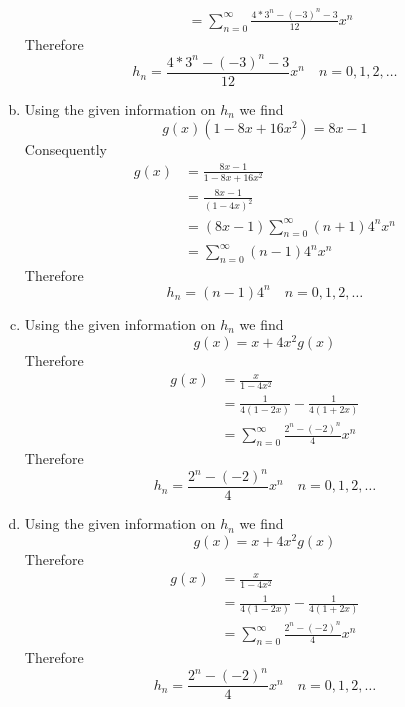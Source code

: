 \documentclass[UTF8]{article}
\begin{document}
\begin{enumerate}[(a)]
\begin{equation}
\begin{aligned}
          &= \sum_{n = 0}^\infty \frac{4*3^{n} - {(-3)}^{n} - 3}{12} x^{n}
          \nonumber
          \end{aligned}
          \end{equation}
          Therefore
          $$ h_{n} = \frac{4*3^{n} - {(-3)}^{n} - 3}{12} x^{n} \quad n=0,1,2, \dots $$
    \item Using the given information on $ h_{n} $ we find
          $$ g(x)(1 - 8x + 16x^2)  = 8x - 1 $$
          Consequently
          \begin{equation}
          \begin{aligned}
          g(x) &= \frac{8x - 1}{1 - 8x + 16x^2} \\
          &= \frac{8x - 1}{(1 - 4x)^2} \\
          &= (8x - 1)\sum_{n = 0}^\infty (n + 1)4^n x^n \\
          &= \sum_{n = 0}^\infty (n - 1)4^n x^n
          \nonumber
          \end{aligned}
          \end{equation}
          Therefore
          $$ h_{n} = (n - 1)4^n \quad n=0,1,2, \dots $$
    \item Using the given information on $ h_{n} $ we find
          $$ g(x)  = x + 4x^{2}g(x) $$
          Therefore
          \begin{equation}
          \begin{aligned}
          g(x) &= \frac{x}{1 - 4x^{2}} \\
          &= \frac{1}{4(1 - 2x)} - \frac{1}{4(1 + 2x)} \\
          &= \sum_{n = 0}^\infty \frac{2^{n} - {(-2)}^{n}}{4} x^{n}
          \nonumber
          \end{aligned}
          \end{equation}
          Therefore
          $$ h_{n} = \frac{2^{n} - {(-2)}^{n}}{4} x^{n} \quad n=0,1,2, \dots $$
    \item Using the given information on $ h_{n} $ we find
          $$ g(x)  = x + 4x^{2}g(x) $$
          Therefore
          \begin{equation}
          \begin{aligned}
          g(x) &= \frac{x}{1 - 4x^{2}} \\
          &= \frac{1}{4(1 - 2x)} - \frac{1}{4(1 + 2x)} \\
          &= \sum_{n = 0}^\infty \frac{2^{n} - {(-2)}^{n}}{4} x^{n}
          \nonumber
          \end{aligned}
          \end{equation}
          Therefore
          $$ h_{n} = \frac{2^{n} - {(-2)}^{n}}{4} x^{n} \quad n=0,1,2, \dots $$
\end{enumerate}
\end{document}
